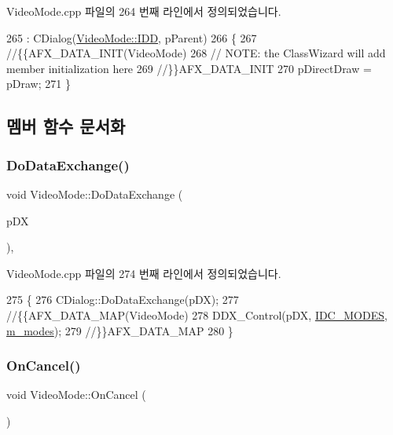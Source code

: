 Video\+Mode.\+cpp 파일의 264 번째 라인에서 정의되었습니다.


\begin{DoxyCode}
265   : CDialog(\mbox{\hyperlink{class_video_mode_a5888f5e68b768e91695a058cace7e5a4a7012b5b58902e093e7c2a0547ef63dd5}{VideoMode::IDD}}, pParent)
266 \{
267   \textcolor{comment}{//\{\{AFX\_DATA\_INIT(VideoMode)}
268   \textcolor{comment}{// NOTE: the ClassWizard will add member initialization here}
269   \textcolor{comment}{//\}\}AFX\_DATA\_INIT}
270   pDirectDraw = pDraw;
271 \}
\end{DoxyCode}


\subsection{멤버 함수 문서화}
\mbox{\label{class_video_mode_a1ba1890dc2533e494de5f16ce05e59c5}} 
\subsubsection{\texorpdfstring{Do\+Data\+Exchange()}{DoDataExchange()}}
{\footnotesize\ttfamily void Video\+Mode\+::\+Do\+Data\+Exchange (\begin{DoxyParamCaption}\item[{C\+Data\+Exchange $\ast$}]{p\+DX }\end{DoxyParamCaption})\hspace{0.3cm}{\ttfamily [protected]}, {\ttfamily [virtual]}}



Video\+Mode.\+cpp 파일의 274 번째 라인에서 정의되었습니다.


\begin{DoxyCode}
275 \{
276   CDialog::DoDataExchange(pDX);
277   \textcolor{comment}{//\{\{AFX\_DATA\_MAP(VideoMode)}
278   DDX\_Control(pDX, \mbox{\hyperlink{resource_8h_add13ac2c5f40c015e5e04ad669b425a4}{IDC\_MODES}}, \mbox{\hyperlink{class_video_mode_a89d4dd07ee169f0f6f4f845582fa3695}{m\_modes}});
279   \textcolor{comment}{//\}\}AFX\_DATA\_MAP}
280 \}
\end{DoxyCode}
\mbox{\label{class_video_mode_ad50575dec1b43e682cdf94a998a5bc1a}} 
\subsubsection{\texorpdfstring{On\+Cancel()}{OnCancel()}}
{\footnotesize\ttfamily void Video\+Mode\+::\+On\+Cancel (\begin{DoxyParamCaption}{ }\end{DoxyParamCaption})\hspace{0.3cm}{\ttfamily [protected]}}



